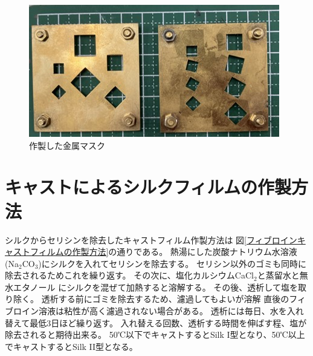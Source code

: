 \documentclass[dvipdfmx,12pt,a4paper]{jreport}
\begin{document}
		\begin{figure}[H]
			\centering
			\includegraphics[scale=0.9]{金属マスク.jpg}
			\caption{作製した金属マスク}
			\label{金属マスク}
		\end{figure}

		\newpage
		\section{キャストによるシルクフィルムの作製方法}
		\label{キャストフィルムの作製方法}
		シルクからセリシンを除去したキャストフィルム作製方法は
		図\ref{フィブロインキャストフィルムの作製方法}の通りである。
		熱湯にした炭酸ナトリウム水溶液(Na$_2$CO$_3$)にシルクを入れてセリシンを除去する。
		セリシン以外のゴミも同時に除去されるためこれを繰り返す。
		その次に、塩化カルシウムCaCl$_2$と蒸留水と無水エタノール
		にシルクを混ぜて加熱すると溶解する。
		その後、透析して塩を取り除く。
		透析する前にゴミを除去するため、濾過してもよいが溶解
		直後のフィブロイン溶液は粘性が高く濾過されない場合がある。
		透析には毎日、水を入れ替えて最低3日ほど繰り返す。
		入れ替える回数、透析する時間を伸ばす程、塩が除去されると期待出来る。
		50℃以下でキャストするとSilk I型となり、50℃以上でキャストするとSilk II型となる。
\end{document}
